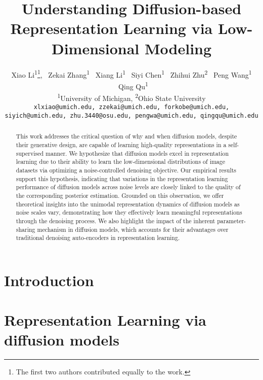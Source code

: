 \documentclass{article}
\title{Understanding Diffusion-based Representation Learning via Low-Dimensional Modeling}
\author{%
  Xiao Li\textsuperscript{1}\thanks{The first two authors contributed equally to the work.}, ~Zekai Zhang\textsuperscript{1} ~Xiang Li\textsuperscript{1} ~Siyi Chen\textsuperscript{1} ~Zhihui Zhu\textsuperscript{2} ~Peng Wang\textsuperscript{1} ~Qing Qu\textsuperscript{1} \\
  \textsuperscript{1}University of Michigan, \textsuperscript{2}Ohio State University\\
  \texttt{xlxiao@umich.edu, zzekai@umich.edu, forkobe@umich.edu, siyich@umich.edu, zhu.3440@osu.edu, pengwa@umich.edu, qingqu@umich.edu}
}
\begin{document}



\maketitle


\begin{abstract}
  This work addresses the critical question of why and when diffusion models, despite their generative design, are capable of learning high-quality representations in a self-supervised manner. We hypothesize that diffusion models excel in representation learning due to their ability to learn the low-dimensional distributions of image datasets via optimizing a noise-controlled denoising objective. Our empirical results support this hypothesis, indicating that variations in the representation learning performance of diffusion models across noise levels are closely linked to the quality of the corresponding posterior estimation. Grounded on this observation, we offer theoretical insights into the unimodal representation dynamics of diffusion models as noise scales vary, demonstrating how they effectively learn meaningful representations through the denoising process. We also highlight the impact of the inherent parameter-sharing mechanism in diffusion models, which accounts for their advantages over traditional denoising auto-encoders in representation learning.
\end{abstract}


\section{Introduction}\label{sec:intro}


\section{Representation Learning via diffusion models}\label{sec:problem}

\end{document}
